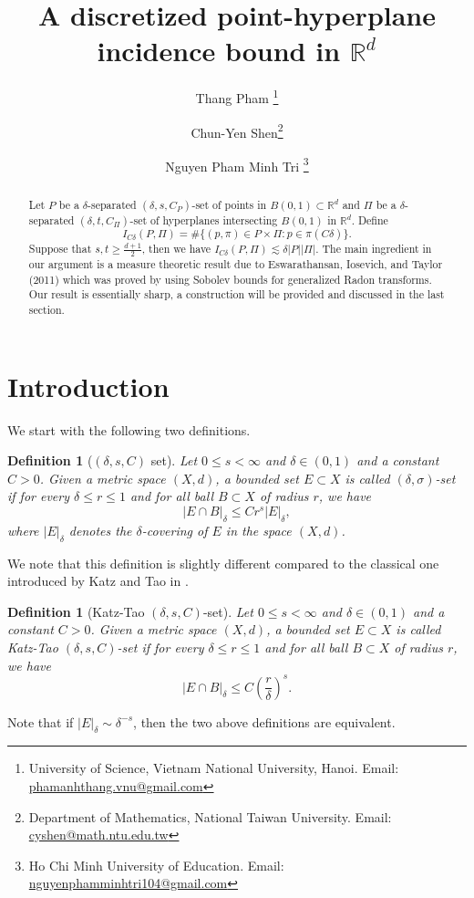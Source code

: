 \documentclass[11pt]{article}
\newtheorem{definition}[theorem]{Definition}
\newcommand{\1}{\mathbf{1}}
\begin{document}
\title{A discretized point-hyperplane incidence bound in $\mathbb{R}^d$}

\author{Thang Pham \thanks{University of Science, Vietnam National University, Hanoi. Email: \href{mailto:phamanhthang.vnu@gmail.com}{phamanhthang.vnu@gmail.com}}\and Chun-Yen Shen\thanks{Department of Mathematics, National Taiwan University. Email: \href{mailto:cyshen@math.ntu.edu.tw}{cyshen@math.ntu.edu.tw}}\and Nguyen Pham Minh Tri \thanks{Ho Chi Minh University of Education. Email: \href{mailto: nguyenphamminhtri104@gmail.com}{nguyenphamminhtri104@gmail.com}}}
\date{}
\maketitle
\begin{abstract}
Let $P$ be a $\delta$-separated $(\delta, s, C_P)$-set of points in $B(0, 1)\subset \mathbb{R}^d$ and $\Pi$ be a $\delta$-separated $(\delta, t, C_\Pi)$-set of hyperplanes intersecting $B(0, 1)$ in $\mathbb{R}^d$. Define 
    \[I_{C\delta}(P, \Pi)=\#\{(p, \pi)\in P\times \Pi\colon p\in \pi(C\delta)\}.\] Suppose that $s, t\ge \frac{d+1}{2}$,
    then we have $I_{C\delta}(P, \Pi)\lesssim \delta |P||\Pi|$. The main ingredient in our argument is a measure theoretic result due to Eswarathansan, Iosevich, and Taylor (2011) which was proved by using Sobolev bounds for generalized Radon transforms. Our result is essentially sharp, a construction will be provided and discussed in the last section.
\end{abstract}
\section{Introduction}
We start with the following two definitions.
\begin{definition}[$(\delta, s, C)$ set]\label{df:our}
Let $0\le s <\infty$ and $\delta\in (0,1)$ and a constant $C>0$. Given a metric space $(X, d)$, a bounded set $E\subset X$ is called $(\delta,\sigma)$-set if for every $\delta\le r\le 1$ and for all ball $B\subset X$ of radius $r$, we have 
\[|E\cap B|_\delta\le C r^s|E|_{\delta},\]
where $|E|_\delta$ denotes the $\delta$-covering of $E$ in the space $(X, d)$. 
\end{definition}
We note that this definition is slightly different compared to the classical one introduced by Katz and Tao in \cite{KatzTao}. 
\begin{definition}[Katz-Tao $(\delta, s, C)$-set]\label{def:kt}
    Let $0\le s <\infty$ and $\delta\in (0,1)$ and a constant $C>0$. Given a metric space $(X, d)$, a bounded set $E\subset X$ is called Katz-Tao $(\delta, s, C)$-set if for every $\delta\le r\le 1$ and for all ball $B\subset X$ of radius $r$, we have 
\[|E\cap B|_\delta\le C \left(\frac{r}{\delta}\right)^s.\]
 
\end{definition}
Note that if $|E|_{\delta}\sim \delta^{-s}$, then the two above definitions are equivalent. 
\end{document}

